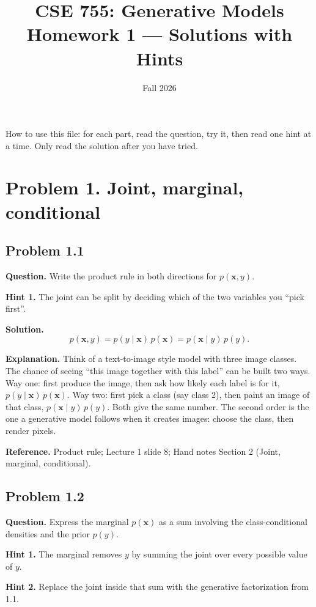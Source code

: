 \documentclass[11pt]{article}
\title{CSE 755: Generative Models\\Homework 1 --- Solutions with Hints}
\author{Fall 2026}
\date{}
\begin{document}
\maketitle

How to use this file: for each part, read the question, try it, then read one hint at a time. Only read the solution after you have tried.

\section*{Problem 1. Joint, marginal, conditional}

\subsection*{Problem 1.1}
\textbf{Question.} Write the product rule in both directions for $p(\mathbf{x}, y)$.

\textbf{Hint 1.} The joint can be split by deciding which of the two variables you ``pick first''.

\textbf{Solution.}
\[
p(\mathbf{x}, y) = p(y \mid \mathbf{x})\, p(\mathbf{x}) = p(\mathbf{x} \mid y)\, p(y).
\]

\textbf{Explanation.} Think of a text-to-image style model with three image classes. The chance of seeing ``this image together with this label'' can be built two ways. Way one: first produce the image, then ask how likely each label is for it, $p(y \mid \mathbf{x})\,p(\mathbf{x})$. Way two: first pick a class (say class 2), then paint an image of that class, $p(\mathbf{x} \mid y)\,p(y)$. Both give the same number. The second order is the one a generative model follows when it creates images: choose the class, then render pixels.

\textbf{Reference.} Product rule; Lecture 1 slide 8; Hand notes Section 2 (Joint, marginal, conditional).

\subsection*{Problem 1.2}
\textbf{Question.} Express the marginal $p(\mathbf{x})$ as a sum involving the class-conditional densities and the prior $p(y)$.

\textbf{Hint 1.} The marginal removes $y$ by summing the joint over every possible value of $y$.

\textbf{Hint 2.} Replace the joint inside that sum with the generative factorization from 1.1.
\end{document}
